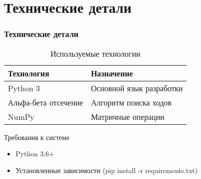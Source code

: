\documentclass[14pt]{beamer}
\begin{document}
\section{Технические детали}

\begin{frame}
\frametitle{Технические детали}
\begin{table}
\centering
\begin{tabular}{ll}
\textbf{Технология} & \textbf{Назначение} \\
\hline
Python 3 & Основной язык разработки \\
Альфа-бета отсечение & Алгоритм поиска ходов \\
NumPy & Матричные операции \\
\end{tabular}
\caption{Используемые технологии}
\end{table}

\begin{alertblock}{Требования к системе}
\begin{itemize}
\item Python 3.6+
\item Установленные зависимости (pip install -r requirements.txt)
\end{itemize}
\end{alertblock}
\end{frame}
\end{document}
